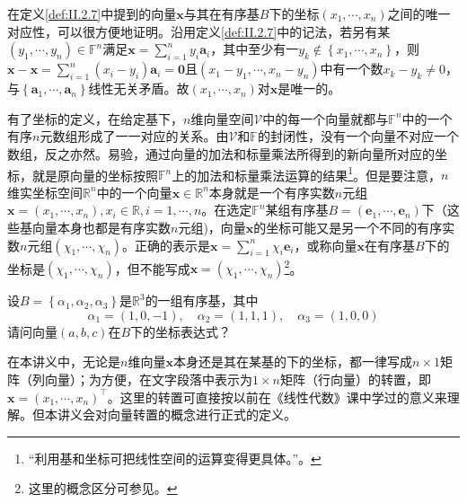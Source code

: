\documentclass[../main.tex]{subfiles}
\begin{document}
在定义\ref{def:II.2.7}中提到的向量$\mathbf{x}$与其在有序基$B$下的坐标$\left(x_1,\cdots,x_n\right)$之间的唯一对应性，可以很方便地证明。沿用定义\ref{def:II.2.7}中的记法，若另有某$\left(y_1,\cdots,y_n\right)\in\mathbb{F}^n$满足$\mathbf{x}=\sum_{i=1}^ny_i\mathbf{a}_i$，其中至少有一$y_k\notin\left\{x_1,\cdots,x_n\right\}$，则$\mathbf{x}-\mathbf{x}=\sum_{i=1}^n\left(x_i-y_i\right)\mathbf{a}_i=\mathbf{0}$且$\left(x_1-y_1,\cdots,x_n-y_n\right)$中有一个数$x_k-y_k\neq 0$，与$\left\{\mathbf{a}_1,\cdots,\mathbf{a}_n\right\}$线性无关矛盾。故$\left(x_1,\cdots,x_n\right)$对$\mathbf{x}$是唯一的。

有了坐标的定义，在给定基下，$n$维向量空间$\mathcal{V}$中的每一个向量就都与$\mathbb{F}^n$中的一个有序$n$元数组形成了一一对应的关系。由$\mathcal{V}$和$\mathbb{F}$的封闭性，没有一个向量不对应一个数组，反之亦然。易验，通过向量的加法和标量乘法所得到的新向量所对应的坐标，就是原向量的坐标按照$\mathbb{F}^n$上的加法和标量乘法运算的结果\footnote{“利用基和坐标可把线性空间的运算变得更具体。”\cite[p.173]{周胜林2012线性代数}。}。但是要注意，$n$维实坐标空间$\mathbb{R}^n$中的一个向量$\mathbf{x}\in\mathbb{R}^n$本身就是一个有序实数$n$元组$\mathbf{x}=\left(x_1,\cdots,x_n\right),x_i\in\mathbb{R},i=1,\cdots,n$。在选定$\mathbb{F}^n$某组有序基$B=\left(\mathbf{e}_1,\cdots,\mathbf{e}_n\right)$下（这些基向量本身也都是有序实数$n$元组)，向量$\mathbf{x}$的坐标可能又是另一个不同的有序实数$n$元组$\left(\chi_1,\cdots,\chi_n\right)$。正确的表示是$\mathbf{x}=\sum_{i=1}^{n}\chi_i\mathbf{e}_i$，或称向量$\mathbf{x}$在有序基$B$下的坐标是$\left(\chi_1,\cdots,\chi_n\right)$，但不能写成$\mathbf{x}=\left(\chi_1,\cdots,\chi_n\right)$\footnote{这里的概念区分可参见\cite[\S 7.1例题2.1]{周胜林2012线性代数}。}。

\begin{example}
    设$B=\left\{\alpha_1,\alpha_2,\alpha_3\right\}$是$\mathbb{R}^3$的一组有序基，其中
    \[
        \alpha_1=\left(1,0,-1\right),\quad\alpha_2=\left(1,1,1\right),\quad\alpha_3=\left(1,0,0\right)
    \]
    请问向量$\left(a,b,c\right)$在$B$下的坐标表达式？
\end{example}


在本讲义中，无论是$n$维向量$\mathbf{x}$本身还是其在某基的下的坐标，都一律写成$n\times 1$矩阵（列向量）；为方便，在文字段落中表示为$1\times n$矩阵（行向量）的转置，即$\mathbf{x}=\left(x_1,\cdots,x_n\right)^\intercal$。这里的转置可直接按以前在《线性代数》课中学过的意义来理解。但本讲义会对向量转置的概念进行正式的定义。

\end{document}
